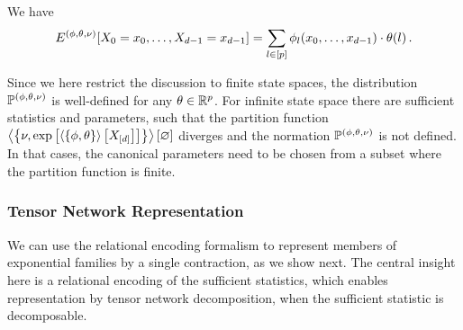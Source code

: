 We have
	\[ E^{(\phi,\theta,\nu)}[X_{0}=x_{0},\ldots,X_{d-1}=x_{d-1}] = \sum_{l\in[p]}\phi_{l}(x_{0},\ldots,x_{d-1}) \cdot \theta(l) \, . \]

Since we here restrict the discussion to finite state spaces, the distribution $\mathbb{P}^{(\phi,\theta,\nu)}$ is well-defined for any $\theta\in\mathbb{R}^{p}$.
For infinite state space there are sufficient statistics and parameters, such that the partition function $\left\langle \left\{\nu,\mathrm{exp}\left[\left\langle \{\phi,\theta\}\right\rangle \left[ X_{[d]} \right]\right]\right\}\right\rangle \left[ \varnothing \right]$ diverges and the normation $\mathbb{P}^{(\phi,\theta,\nu)}$ is not defined.
In that cases, the canonical parameters need to be chosen from a subset where the partition function is finite. 



\subsubsection{Tensor Network Representation} 

We can use the relational encoding formalism to represent members of exponential families by a single contraction, as we show next.
The central insight here is a relational encoding of the sufficient statistics, which enables representation by tensor network decomposition, when the sufficient statistic is decomposable.

